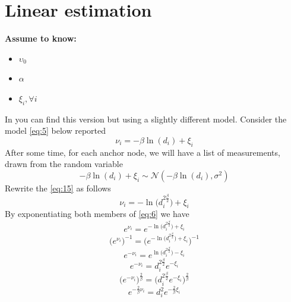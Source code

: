 \documentclass[12pt,twoside]{report}
\begin{document}
\section{Linear estimation}
  \begin{center}
  \textbf{Assume to know:}
  \begin{itemize}
    \centering
    \item $\upsilon_0$
    \item $\alpha$
    \item $\xi_i,\forall i$
  \end{itemize}
  \end{center}
In \cite{rzk} you can find this version but using a slightly different model.
Consider the model \ref{eq:5} below reported
\begin{equation}
    \nu_i=-\beta\ln(d_i)+\xi_i
    \label{eq:15}
\end{equation}
After some time, for each anchor node, we will have a list of measurements, drawn from the random variable 
\begin{equation}
-\beta\ln(d_i)+\xi_i\sim \mathcal{N}(-\beta\ln(d_i),\sigma^2)
\label{eq:14}
\end{equation}
Rewrite the \ref{eq:15} as follows 
\begin{equation}
    \nu_i=-\ln\big(d_i^{2\frac{\beta}{2}}\big)+\xi_i
    \label{eq:6}
\end{equation}
By exponentiating both members of \ref{eq:6} we have 
\begin{equation}
    e^{\nu_i}=e^{-\ln\big(d_i^{2\frac{\beta}{2}}\big)+\xi_i}
\end{equation}
\begin{equation}
    \bigg(e^{\nu_i}\bigg)^{-1}=\bigg(e^{-\ln\big(d_i^{2\frac{\beta}{2}}\big)+\xi_i}\bigg)^{-1}
\end{equation}
\begin{equation}
    e^{-\nu_i}=e^{\ln\big(d_i^{2\frac{\beta}{2}}\big)-\xi_i}
\end{equation}
\begin{equation}
    e^{-\nu_i}=d_i^{2\frac{\beta}{2}}e^{-\xi_i}
\end{equation}
\begin{equation}
    \bigg(e^{-\nu_i}\bigg)^{\frac{2}{\beta}}=\bigg(d_i^{2\frac{\beta}{2}}e^{-\xi_i}\bigg)^{\frac{2}{\beta}}
\end{equation}
\begin{equation}
    e^{-\frac{2}{\beta}\nu_i}=d_i^2e^{-\frac{2}{\beta}\xi_i}
\end{equation}
\end{document}
